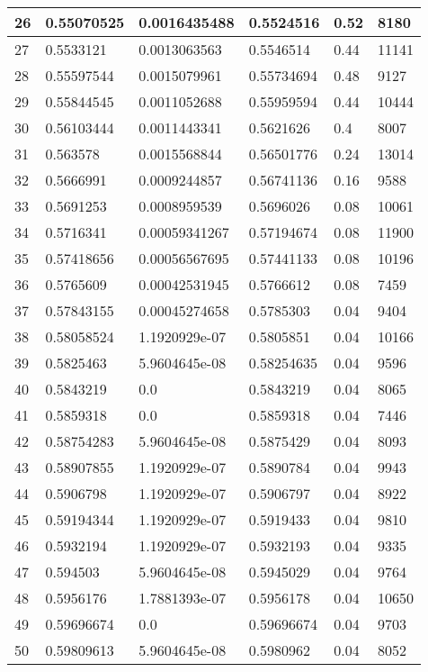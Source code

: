 \begin{longtable}{|l|l|l|l|l|l|}
26 & 0.55070525 & 0.0016435488 & 0.5524516 & 0.52 & 8180 \\ \hline 
27 & 0.5533121 & 0.0013063563 & 0.5546514 & 0.44 & 11141 \\ \hline 
28 & 0.55597544 & 0.0015079961 & 0.55734694 & 0.48 & 9127 \\ \hline 
29 & 0.55844545 & 0.0011052688 & 0.55959594 & 0.44 & 10444 \\ \hline 
30 & 0.56103444 & 0.0011443341 & 0.5621626 & 0.4 & 8007 \\ \hline 
31 & 0.563578 & 0.0015568844 & 0.56501776 & 0.24 & 13014 \\ \hline 
32 & 0.5666991 & 0.0009244857 & 0.56741136 & 0.16 & 9588 \\ \hline 
33 & 0.5691253 & 0.0008959539 & 0.5696026 & 0.08 & 10061 \\ \hline 
34 & 0.5716341 & 0.00059341267 & 0.57194674 & 0.08 & 11900 \\ \hline 
35 & 0.57418656 & 0.00056567695 & 0.57441133 & 0.08 & 10196 \\ \hline 
36 & 0.5765609 & 0.00042531945 & 0.5766612 & 0.08 & 7459 \\ \hline 
37 & 0.57843155 & 0.00045274658 & 0.5785303 & 0.04 & 9404 \\ \hline 
38 & 0.58058524 & 1.1920929e-07 & 0.5805851 & 0.04 & 10166 \\ \hline 
39 & 0.5825463 & 5.9604645e-08 & 0.58254635 & 0.04 & 9596 \\ \hline 
40 & 0.5843219 & 0.0 & 0.5843219 & 0.04 & 8065 \\ \hline 
41 & 0.5859318 & 0.0 & 0.5859318 & 0.04 & 7446 \\ \hline 
42 & 0.58754283 & 5.9604645e-08 & 0.5875429 & 0.04 & 8093 \\ \hline 
43 & 0.58907855 & 1.1920929e-07 & 0.5890784 & 0.04 & 9943 \\ \hline 
44 & 0.5906798 & 1.1920929e-07 & 0.5906797 & 0.04 & 8922 \\ \hline 
45 & 0.59194344 & 1.1920929e-07 & 0.5919433 & 0.04 & 9810 \\ \hline 
46 & 0.5932194 & 1.1920929e-07 & 0.5932193 & 0.04 & 9335 \\ \hline 
47 & 0.594503 & 5.9604645e-08 & 0.5945029 & 0.04 & 9764 \\ \hline 
48 & 0.5956176 & 1.7881393e-07 & 0.5956178 & 0.04 & 10650 \\ \hline 
49 & 0.59696674 & 0.0 & 0.59696674 & 0.04 & 9703 \\ \hline 
50 & 0.59809613 & 5.9604645e-08 & 0.5980962 & 0.04 & 8052 \\ \hline 

\end{longtable}
